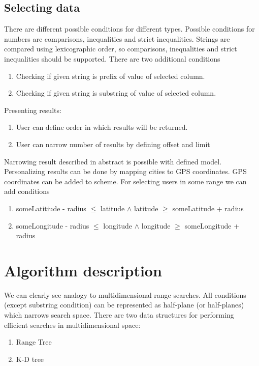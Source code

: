 \documentclass[10pt,a4paper]{article}
\begin{document}
\subsection{Selecting data}
There are different possible conditions for different types. Possible conditions for numbers are comparisons, inequalities and strict inequalities. Strings are compared using lexicographic order, so comparisons, inequalities and strict inequalities should be supported. There are two additional conditions
\begin{enumerate}
\item Checking if given string is prefix of value of selected column. 
\item Checking if given string is substring of value of selected column. 
\end{enumerate}
Presenting results:
\begin{enumerate}
\item User can define order in which results will be returned.
\item User can narrow number of results by defining offset and 
limit
\end{enumerate}

Narrowing result described in abstract is possible with defined model. Personalizing results can be done by mapping cities to GPS coordinates. GPS coordinates can be added to scheme. For selecting users in some range we can add conditions   
\begin{enumerate}
\item{someLatitiude - radius $\leq$ latitude $\wedge$ latitude $\geq$ someLatitude + radius}
\item{someLongitude - radius $\leq$ longitude $\wedge$ longitude $\geq$ someLongitude + radius}
\end{enumerate}

\section{Algorithm description}
We can clearly see analogy to multidimensional range searches. All conditions (except substring condition) can be represented as half-plane (or half-planes) which narrows search space. There are two data structures for performing efficient searches in multidimensional space:

\begin{enumerate}
\item Range Tree \cite{CGAAA}
\item K-D tree \cite{CGAAA}
\end{enumerate}
\end{document}
